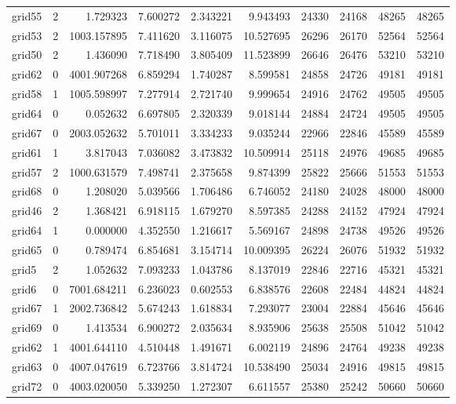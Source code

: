 \begin{longtable}{|l|r|r|r|r|r|r|r|r|r|}
grid55 & 2 & 1.729323 & 7.600272 & 2.343221 & 9.943493 & 24330 & 24168 & 48265 & 48265 \\
grid53 & 2 & 1003.157895 & 7.411620 & 3.116075 & 10.527695 & 26296 & 26170 & 52564 & 52564 \\
grid50 & 2 & 1.436090 & 7.718490 & 3.805409 & 11.523899 & 26646 & 26476 & 53210 & 53210 \\
grid62 & 0 & 4001.907268 & 6.859294 & 1.740287 & 8.599581 & 24858 & 24726 & 49181 & 49181 \\
grid58 & 1 & 1005.598997 & 7.277914 & 2.721740 & 9.999654 & 24916 & 24762 & 49505 & 49505 \\
grid64 & 0 & 0.052632 & 6.697805 & 2.320339 & 9.018144 & 24884 & 24724 & 49505 & 49505 \\
grid67 & 0 & 2003.052632 & 5.701011 & 3.334233 & 9.035244 & 22966 & 22846 & 45589 & 45589 \\
grid61 & 1 & 3.817043 & 7.036082 & 3.473832 & 10.509914 & 25118 & 24976 & 49685 & 49685 \\
grid57 & 2 & 1000.631579 & 7.498741 & 2.375658 & 9.874399 & 25822 & 25666 & 51553 & 51553 \\
grid68 & 0 & 1.208020 & 5.039566 & 1.706486 & 6.746052 & 24180 & 24028 & 48000 & 48000 \\
grid46 & 2 & 1.368421 & 6.918115 & 1.679270 & 8.597385 & 24288 & 24152 & 47924 & 47924 \\
grid64 & 1 & 0.000000 & 4.352550 & 1.216617 & 5.569167 & 24898 & 24738 & 49526 & 49526 \\
grid65 & 0 & 0.789474 & 6.854681 & 3.154714 & 10.009395 & 26224 & 26076 & 51932 & 51932 \\
grid5 & 2 & 1.052632 & 7.093233 & 1.043786 & 8.137019 & 22846 & 22716 & 45321 & 45321 \\
grid6 & 0 & 7001.684211 & 6.236023 & 0.602553 & 6.838576 & 22608 & 22484 & 44824 & 44824 \\
grid67 & 1 & 2002.736842 & 5.674243 & 1.618834 & 7.293077 & 23004 & 22884 & 45646 & 45646 \\
grid69 & 0 & 1.413534 & 6.900272 & 2.035634 & 8.935906 & 25638 & 25508 & 51042 & 51042 \\
grid62 & 1 & 4001.644110 & 4.510448 & 1.491671 & 6.002119 & 24896 & 24764 & 49238 & 49238 \\
grid63 & 0 & 4007.047619 & 6.723766 & 3.814724 & 10.538490 & 25034 & 24916 & 49815 & 49815 \\
grid72 & 0 & 4003.020050 & 5.339250 & 1.272307 & 6.611557 & 25380 & 25242 & 50660 & 50660 \\

\end{longtable}
